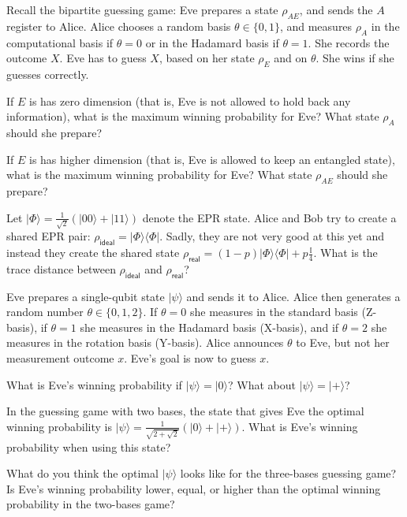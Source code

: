 \documentclass[a4paper,10pt,landscape,twocolumn]{scrartcl}
\newcommand{\ket}[1]{\lvert #1 \rangle}
\newcommand{\bra}[1]{\langle #1 \rvert}
\newcommand{\id}{\mathbb{I}}
\begin{document}
\begin{exercise}
Recall the bipartite guessing game: Eve prepares a state $\rho_{AE}$, and sends the $A$ register to Alice. Alice chooses a random basis $\theta \in \{0,1\}$, and measures $\rho_A$ in the computational basis if $\theta = 0$ or in the Hadamard basis if $\theta = 1$. She records the outcome $X$. Eve has to guess $X$, based on her state $\rho_E$ and on $\theta$. She wins if she guesses correctly.

\begin{subex}
If $E$ is has zero dimension (that is, Eve is not allowed to hold back any information), what is the maximum winning probability for Eve? What state $\rho_A$ should she prepare?
\end{subex}

\begin{subex}
If $E$ is has higher dimension (that is, Eve is allowed to keep an entangled state), what is the maximum winning probability for Eve? What state $\rho_{AE}$ should she prepare?
\end{subex}
\end{exercise}

\begin{exercise}
	Let $\ket{\Phi} = \frac{1}{\sqrt{2}}(\ket{00} + \ket{11})$ denote the EPR state. Alice and Bob try to create a shared EPR pair: $\rho_{\mathsf{ideal}} = \ket{\Phi}\bra{\Phi}$. Sadly, they are not very good at this yet and instead they create the shared state $\rho_{\mathsf{real}} = (1-p)\ket{\Phi}\bra{\Phi} + p \frac{\id}{4}$. What is the trace distance between $\rho_{\mathsf{ideal}}$ and $\rho_{\mathsf{real}}$?
\end{exercise}


\begin{exercise}
	Eve prepares a single-qubit state $\ket{\psi}$ and sends it to Alice. Alice then generates a random number $\theta \in \{0,1,2\}$. If $\theta = 0$ she measures in the standard basis (Z-basis), if $\theta = 1$ she measures in the Hadamard basis (X-basis), and if $\theta = 2$ she measures in the rotation basis (Y-basis). Alice announces $\theta$ to Eve, but not her measurement outcome $x$. Eve's goal is now to guess $x$.
	\begin{subex}
		What is Eve's winning probability if $\ket{\psi} = \ket0$? What about $\ket{\psi} = \ket{+}$?
	\end{subex}
	\begin{subex}
		In the guessing game with two bases, the state that gives Eve the optimal winning probability is $\ket{\psi} = \frac{1}{\sqrt{2 + \sqrt{2}}} (\ket0 + \ket{+})$. What is Eve's winning probability when using this state?
	\end{subex}
\begin{subex}
	What do you think the optimal $\ket{\psi}$ looks like for the three-bases guessing game? Is Eve's winning probability lower, equal, or higher than the optimal winning probability in the two-bases game?
\end{subex}
\end{exercise}
\end{document}

